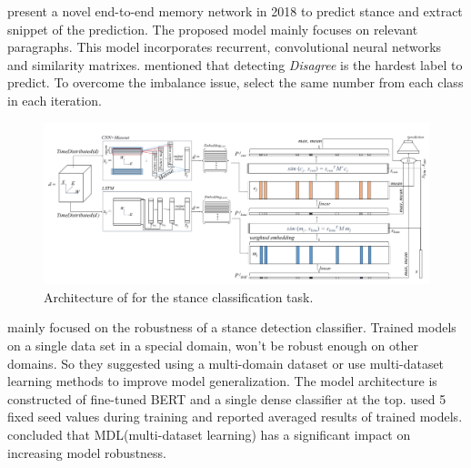 \cite{memory_network} present a novel end-to-end memory network in 2018 to predict stance and extract snippet of the prediction. The proposed model mainly focuses on relevant paragraphs. This model incorporates recurrent, convolutional neural networks and similarity matrixes. \cite{memory_network} mentioned that detecting \textit{Disagree} is the hardest label to predict. To overcome the imbalance issue, \cite{memory_network} select the same number from each class in each iteration. 
\begin{figure}
	\centering
	\includegraphics[scale=0.25]{statistics/stance/memoty_network.png}
	\caption{Architecture of \cite{memory_network} for the stance classification task.}
	\label{fig:mem_network}
\end{figure}

\cite{stance_robust} mainly focused on the robustness of a stance detection classifier. Trained models  on a single data set in a special domain, won't be robust enough on other domains. So they suggested using a multi-domain dataset or use multi-dataset learning methods to improve model generalization. The model architecture is constructed of fine-tuned \ac{BERT}\cite{bert} and a single dense classifier at the top. \cite{stance_robust} used 5 fixed seed values during training and reported averaged results of trained models. \cite{stance_robust} concluded that \ac{MDL}(multi-dataset learning) has a significant impact on increasing model robustness.
